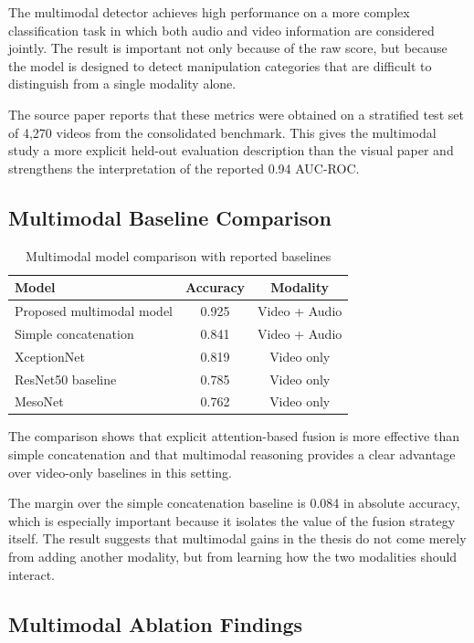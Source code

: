 The multimodal detector achieves high performance on a more complex classification task in which both audio and video information are considered jointly. The result is important not only because of the raw score, but because the model is designed to detect manipulation categories that are difficult to distinguish from a single modality alone.

The source paper reports that these metrics were obtained on a stratified test set of 4,270 videos from the consolidated benchmark. This gives the multimodal study a more explicit held-out evaluation description than the visual paper and strengthens the interpretation of the reported 0.94 AUC-ROC.

\subsection{Multimodal Baseline Comparison}

\begin{table}[H]
\centering
\caption{Multimodal model comparison with reported baselines}
\label{tab:multimodal-baselines}
\begin{tabular}{l c c}
\toprule
\textbf{Model} & \textbf{Accuracy} & \textbf{Modality} \\
\midrule
Proposed multimodal model & 0.925 & Video + Audio \\
Simple concatenation & 0.841 & Video + Audio \\
XceptionNet & 0.819 & Video only \\
ResNet50 baseline & 0.785 & Video only \\
MesoNet & 0.762 & Video only \\
\bottomrule
\end{tabular}
\end{table}

The comparison shows that explicit attention-based fusion is more effective than simple concatenation and that multimodal reasoning provides a clear advantage over video-only baselines in this setting.

The margin over the simple concatenation baseline is 0.084 in absolute accuracy, which is especially important because it isolates the value of the fusion strategy itself. The result suggests that multimodal gains in the thesis do not come merely from adding another modality, but from learning how the two modalities should interact.

\subsection{Multimodal Ablation Findings}

